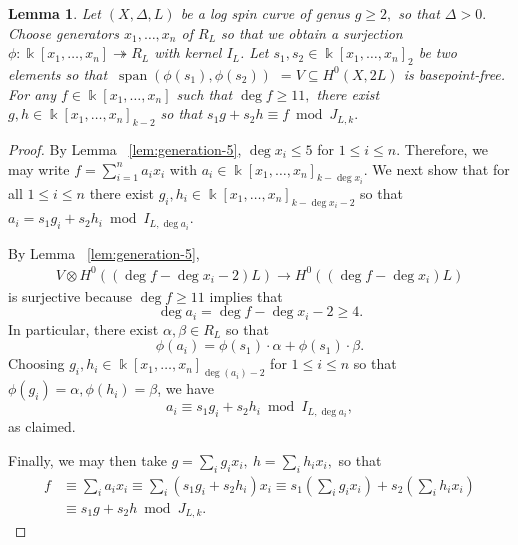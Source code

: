 \documentclass{amsart}
\theoremstyle{plain}
\newtheorem{lem}[thm]{Lemma}
\theoremstyle{definition}
\theoremstyle{remark}
\numberwithin{equation}{section}
\newcommand\Bk{{\Bbbk}}
\newcommand{\halfcan}{L}
\DeclareMathOperator{\newspan}{span}
\begin{document}
\begin{lem}
\label{lem:reducing-degree}
Let $(X, \Delta, \halfcan)$ be a log spin curve of genus $g \geq 2,$ so
that $\Delta > 0.$ Choose generators $x_1, \ldots, x_n$ of $R_\halfcan$ so
that we obtain a surjection $\phi: \Bk[x_1, \ldots, x_n]
\twoheadrightarrow R_\halfcan$ with kernel $I_L$. Let $s_1, s_2 \in \Bk[x_1,
\ldots, x_n]_2$ be two elements so that $\: \newspan(\phi(s_1), \phi(s_2))$
$= V \subseteq H^0(X, 2\halfcan)$ is basepoint-free. For any $f \in
\Bk[x_1, \ldots, x_n]$ such that $\deg f \geq 11,$ there exist $g, h \in
\Bk[x_1, \ldots, x_n]_{k - 2}$ so that $s_1 g + s_2 h \equiv f \bmod J_{\halfcan, k}.$
\end{lem}
\begin{proof}
By Lemma ~\ref{lem:generation-5}, $\deg x_i \leq 5$ for $1 \leq i \leq n$. Therefore, we may write $f = \sum_{i = 1}^{n}a_i x_i$ with $a_i \in \Bk[x_1, \ldots, x_n]_{k-\deg x_i}$.
We next show that for all $1 \leq i \leq n$ there exist $g_i, h_i \in \Bk[x_1, \ldots, x_n]_{k - \deg x_i - 2}$ so that $a_i = s_1g_i + s_2h_i \bmod I_{\halfcan, \deg a_i}.$ 

By Lemma ~\ref{lem:generation-5},
\begin{align*}
	V \otimes H^0((\deg f-\deg x_i -2)\halfcan) \rightarrow H^0((\deg f-\deg x_i)\halfcan)
\end{align*}
is surjective because $\deg f \geq 11$ implies that
$$\deg a_i =\deg f - \deg x_i -2 \geq 4.$$
In particular, there exist $\alpha, \beta \in R_\halfcan$ so that
$$\phi(a_i) = \phi(s_1) \cdot \alpha + \phi(s_1) \cdot \beta.$$ 
Choosing $g_i,h_i\in \Bk[x_1, \ldots, x_n]_{\deg(a_i)-2}$ for $1 \leq i \leq n$ so that $\phi(g_i) = \alpha, \phi(h_i) = \beta$, we have 
$$a_i \equiv s_1 g_i + s_2 h_i \bmod I_{\halfcan, \deg a_i},$$ as claimed.

Finally, we may then take $g = \sum_{i}^{}g_i x_i, \: h = \sum_{i}^{}h_i x_i,$ so that 
\begin{align*}
	f &\equiv \sum_{i}^{}a_i x_i \equiv \sum_{i}^{}(s_1g_i + s_2h_i)x_i \equiv s_1 \left( \sum_{i}^{}g_i x_i \right) + s_2 \left( \sum_{i}^{}h_i x_i \right) \\
	&\equiv s_1 g + s_2 h \bmod J_{L,k}.
\end{align*}
\end{proof}
\end{document}
